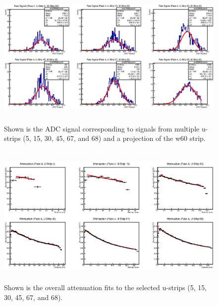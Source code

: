 \begin{figure}[h]
    \centering
    \includegraphics[height= 2.75in, keepaspectratio = true]{pass4}
    \caption{Shown is the ADC signal corresponding to signals from multiple u-strips (5, 15, 30, 45, 67, and 68) and a projection of the w60 strip.}
    \label{fig:pass4}
\end{figure}

\begin{figure}[h]
    \centering
    \includegraphics[height= 2.75in, keepaspectratio = true]{atpass4}
    \caption{Shown is the overall attenuation fits to the selected u-strips (5, 15, 30, 45, 67, and 68).}
    \label{fig:atpass4}
\end{figure}


\clearpage
\FloatBarrier
